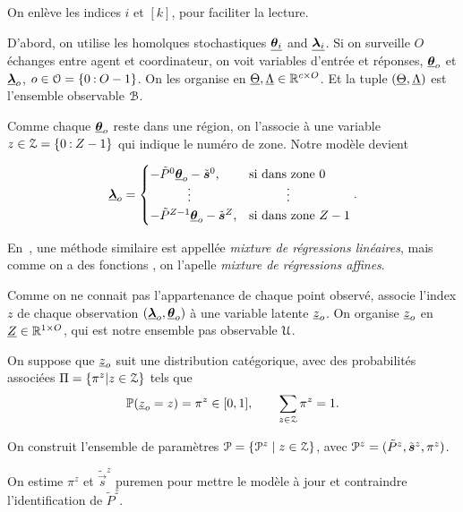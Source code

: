 \documentclass[../main.tex]{subfiles}
\begin{document}
On enlève les indices $i$ et $[k]$, pour faciliter la lecture.

D'abord, on utilise les homolques stochastiques $\underline{\boldsymbol{\theta}_{i}}$ and $\underline{\boldsymbol{\lambda}_{i}}$.
Si on surveille $O$ échanges entre agent et coordinateur, on voit variables d'entrée et réponses, ${\underline{\boldsymbol{\theta}}_{o}}$ et ${\underline{\boldsymbol{\lambda}}_{o}}$, ${o\in\mathcal{O}=\{0\mathbin{:} O-1\}}$.
On les organise en ${\underline{\Theta},\underline{\Lambda}\in\mathbb{R}^{c\times O}}$.
Et la tuple ${(\underline{\Theta},\underline{\Lambda})}$ est l'ensemble observable $\mathcal{B}$.

Comme chaque ${\underline{\boldsymbol{\theta}}}_{o}$ reste dans une région, on l'associe à une variable ${z\in\mathcal{Z}=\{0\mathbin{:} Z-1\}}$ qui indique le numéro de zone.
Notre modèle devient

\begin{equation}\label{eq:linear_cheating_random_fr}
  \randomvec{\lambda}_{o}=
  \begin{cases}
    -\tilde{P}^{0}\randomvec{\theta}_{o}-\tilde{\vec{s}}^{0},&\text{si dans zone } 0\\
    \qquad\quad \vdots&\qquad\quad \vdots\\
    -\tilde{P}^{Z-1}\randomvec{\theta}_{o}-\tilde{\vec{s}}^{Z},&\text{si dans zone } {Z-1}\\
  \end{cases}.
\end{equation}

En~\cite{FariaSoromenho2010}, une méthode similaire est appellée \emph{mixture de régressions linéaires}, mais comme on a des fonctions \pwa{}, on l'apelle \emph{mixture de régressions affines}.

Comme on ne connait pas l'appartenance de chaque point observé, associe l'index $z$ de chaque observation ${({\underline{\boldsymbol{\lambda}}}_{o}, {\underline{\boldsymbol{\theta}}}_{o})}$ à une variable latente ${\underline{z}_{o}}$.
On organise $\underline{z}_{o}$ en ${\underline{Z}\in\mathbb{R}^{1\times O}}$, qui est notre ensemble pas observable $\mathcal{U}$.

On suppose que $\underline{z}_{o}$ suit une distribution catégorique, avec des probabilités associées ${\Pi=\{\pi^{z}|z\in\mathcal{Z}\}}$ tels que
\[\mathbb{P}(\underline{z}_{o}=z)=\pi^{z} \in [0,1], \qquad \sum_{z\in\mathcal{Z}} \pi^{z} = 1.
\]

On construit l'ensemble de paramètres ${\mathcal{P}=\{\mathcal{P}^{z}\mid z\in\mathcal{Z}\}}$, avec ${\mathcal{P}^{z}=(\tilde{P}^{z},\tilde{\boldsymbol{s}}^{z},\pi^{z})}$.

\begin{remark}
  On estime $\pi^{z}$ et $\tilde{\vec{s}}^{z}$ puremen pour mettre le modèle à jour et contraindre l'identification de $\tilde{P}^{z}$.
\end{remark}
\end{document}
